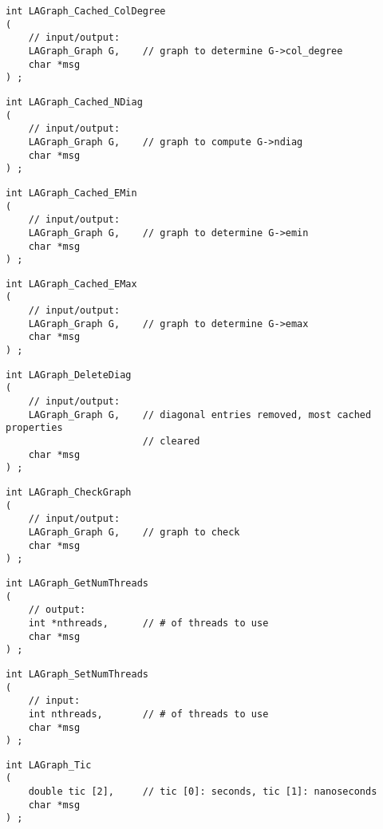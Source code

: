 \begin{verbatim}
int LAGraph_Cached_ColDegree
(
    // input/output:
    LAGraph_Graph G,    // graph to determine G->col_degree
    char *msg
) ;
\end{verbatim}




\begin{verbatim}
int LAGraph_Cached_NDiag
(
    // input/output:
    LAGraph_Graph G,    // graph to compute G->ndiag
    char *msg
) ;
\end{verbatim}




\begin{verbatim}
int LAGraph_Cached_EMin
(
    // input/output:
    LAGraph_Graph G,    // graph to determine G->emin
    char *msg
) ;
\end{verbatim}




\begin{verbatim}
int LAGraph_Cached_EMax
(
    // input/output:
    LAGraph_Graph G,    // graph to determine G->emax
    char *msg
) ;
\end{verbatim}




\begin{verbatim}
int LAGraph_DeleteDiag
(
    // input/output:
    LAGraph_Graph G,    // diagonal entries removed, most cached properties
                        // cleared
    char *msg
) ;
\end{verbatim}




\begin{verbatim}
int LAGraph_CheckGraph
(
    // input/output:
    LAGraph_Graph G,    // graph to check
    char *msg
) ;
\end{verbatim}




\begin{verbatim}
int LAGraph_GetNumThreads
(
    // output:
    int *nthreads,      // # of threads to use
    char *msg
) ;
\end{verbatim}




\begin{verbatim}
int LAGraph_SetNumThreads
(
    // input:
    int nthreads,       // # of threads to use
    char *msg
) ;
\end{verbatim}




\begin{verbatim}
int LAGraph_Tic
(
    double tic [2],     // tic [0]: seconds, tic [1]: nanoseconds
    char *msg
) ;
\end{verbatim}




